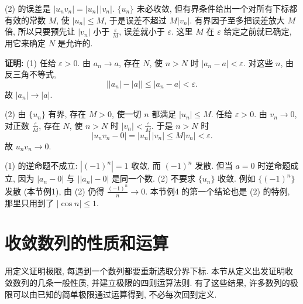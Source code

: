 \documentclass[UTF8,openany]{ctexbook}
\theoremstyle{chinesetextbook}
\newenvironment{cnproof}{\par\indent\textbf{证明:} \ignorespaces}{\par}
\begin{document}
(2) 的误差是 $|u_nv_n|=|u_n|\,|v_n|$. $\{u_n\}$ 未必收敛, 但有界条件给出一个对所有下标都有效的常数 $M$, 使 $|u_n|\le M$, 于是误差不超过 $M|v_n|$. 有界因子至多把误差放大 $M$ 倍, 所以只要预先让 $|v_n|$ 小于 $\displaystyle\frac\varepsilon M$, 误差就小于 $\varepsilon$. 这里 $M$ 在 $\varepsilon$ 给定之前就已确定, 用它来确定 $N$ 是允许的.
\begin{cnproof}
(1) 任给 $\varepsilon>0$. 由 $a_n\to a$, 存在 $N$, 使 $n>N$ 时 $|a_n-a|<\varepsilon$. 对这些 $n$, 由反三角不等式,
\[
\bigl||a_n|-|a|\bigr|\le|a_n-a|<\varepsilon.
\]
故 $|a_n|\to|a|$.

(2) 由 $\{u_n\}$ 有界, 存在 $M>0$, 使一切 $n$ 都满足 $|u_n|\le M$. 任给 $\varepsilon>0$. 由 $v_n\to0$, 对正数 $\displaystyle\frac\varepsilon M$, 存在 $N$, 使 $n>N$ 时 $\displaystyle|v_n|<\frac\varepsilon M$. 于是 $n>N$ 时
\[
|u_nv_n-0|=|u_n|\,|v_n|\le M|v_n|<\varepsilon.
\]
故 $u_nv_n\to0$.
\end{cnproof}
(1) 的逆命题不成立: $|(-1)^n|=1$ 收敛, 而 $(-1)^n$ 发散. 但当 $a=0$ 时逆命题成立, 因为 $|a_n-0|$ 与 $\bigl||a_n|-0\bigr|$ 是同一个数. (2) 不要求 $\{u_n\}$ 收敛. 例如 $\{(-1)^n\}$ 发散 (本节例1), 由 (2) 仍得 $\displaystyle\frac{(-1)^n}n\to0$. 本节例4 的第一个结论也是 (2) 的特例, 那里只用到了 $|\cos n|\le1$.
\section{收敛数列的性质和运算}
用定义证明极限, 每遇到一个数列都要重新选取分界下标. 本节从定义出发证明收敛数列的几条一般性质, 并建立极限的四则运算法则. 有了这些结果, 许多数列的极限可以由已知的简单极限通过运算得到, 不必每次回到定义.
\end{document}
